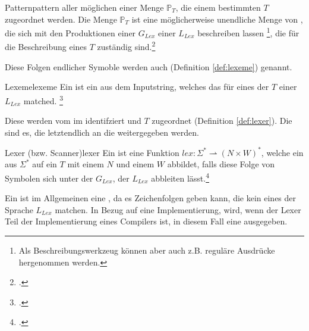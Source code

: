 \begin{Definition}{Pattern}{pattern}
   aller möglichen  einer Menge $\mathbb{P}_{T}$, die einem bestimmten  $T$ zugeordnet werden.
  Die Menge $\mathbb{P}_{T}$ ist eine möglicherweise unendliche Menge von , die sich mit den Produktionen einer  ${G}_{Lex}$ einer  ${L}_{Lex}$ beschreiben lassen \footnote{Als Beschreibungswerkzeug können aber auch z.B. reguläre Ausdrücke hergenommen werden.}, die für die Beschreibung eines  $T$ zuständig sind.\footcite{noauthor_what_nodate}
\end{Definition}

Diese Folgen endlicher Symoble werden auch  (Definition \ref{def:lexeme}) genannt.

\begin{Definition}{Lexeme}{lexeme}
  Ein  ist ein  aus dem Inputstring, welches das  für eines der  $T$ einer  ${L}_{Lex}$ matched.
\footcite{noauthor_what_nodate}
\end{Definition}

Diese  werden vom  im  identifziert und  $T$ zugeordnet (Definition \ref{def:lexer}). Die  sind es, die letztendlich an die  weitergegeben werden.

\begin{Definition}{Lexer (bzw. Scanner)}{lexer}
  Ein  ist eine  Funktion \hspace{0.2cm}$lex: \Sigma^{*} \rightharpoonup (N \times W)^{*}$, welche ein  aus $\Sigma^{*}$ auf ein  $T$ mit einem  $N$ und einem  $W$ abbildet, falls diese Folge von Symbolen sich unter der  ${G}_{Lex}$, der  ${L_{Lex}}$ abbleiten lässt.\footcite{noauthor_lecture-notes-2021_2022}
\end{Definition}

Ein  ist im Allgemeinen eine , da es Zeichenfolgen geben kann, die kein  eines  der Sprache $L_{Lex}$ matchen. In Bezug auf eine Implementierung, wird, wenn der Lexer Teil der Implementierung eines Compilers ist, in diesem Fall eine  ausgegeben.

